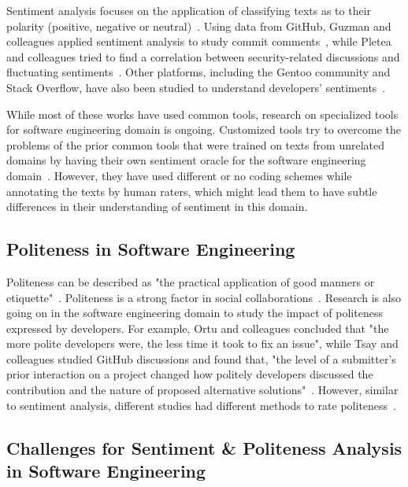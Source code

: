 Sentiment analysis focuses on the application of 
classifying texts as to their polarity 
(positive, negative or neutral)~\cite{pang2008opinion}. 
Using data from GitHub, 
Guzman and colleagues applied sentiment analysis 
to study commit comments~\cite{guzman2014sentiment}, 
while Pletea and colleagues tried to find a correlation between security-related discussions and fluctuating sentiments~\cite{pletea2014security}. 
Other platforms, 
including the Gentoo community and Stack Overflow, 
have also been studied to understand developers' 
sentiments~\cite{garcia2013role,islam2016towards,guzman2013towards,novielli2014towards}.

While most of these works have used common tools, 
research on specialized tools for software engineering domain 
is ongoing. 
Customized tools try to overcome the problems 
of the prior common tools 
that were trained on texts 
from unrelated domains 
by having their own sentiment oracle 
for the software engineering domain~\cite{ahmed2017senticr,calefato2017sentiment}. 
However, they have used different or no coding schemes 
while annotating the texts by human raters, 
which might lead them to have subtle differences in their understanding of sentiment in this domain.

\subsection{Politeness in Software Engineering}

Politeness can be described as 
"the practical application of good manners or etiquette"~\cite{wiki:pol}. 
Politeness is a strong factor in social collaborations~\cite{ortu2015would,wang2008politeness}. 
Research is also going on in the software engineering domain 
to study the impact of politeness expressed by developers. 
For example, Ortu and colleagues concluded that 
"the more polite developers were, 
the less time it took to fix an issue", 
while Tsay and colleagues studied GitHub discussions 
and found that, 
"the level of a submitter's prior interaction on a project changed how politely developers discussed the contribution and the nature of proposed alternative solutions"~\cite{ortu2015would,tsay2014let}. However, similar to sentiment analysis, different studies had different methods to rate politeness~\cite{tsay2014let,brownsoftware}.


\subsection{Challenges for Sentiment \& Politeness Analysis in Software Engineering}

